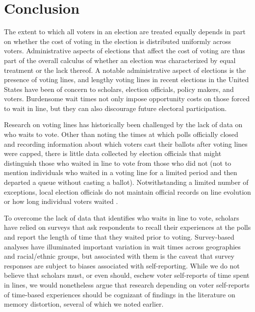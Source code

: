 \documentclass[12pt,titlepage]{article}
\begin{document}
\section*{Conclusion}

The extent to which all voters in an election are treated equally
depends in part on whether the cost of voting in the election is
distributed uniformly across voters. Administrative aspects of
elections that affect the cost of voting are thus part of the overall
calculus of whether an election was characterized by equal treatment
or the lack thereof.  A notable administrative aspect of elections is
the presence of voting lines, and lengthy voting lines in recent
elections in the United States have been of concern to scholars,
election officials, policy makers, and voters.  Burdensome wait times
not only impose opportunity costs on those forced to wait in line, but
they can also discourage future electoral participation.

Research on voting lines has historically been challenged by the lack
of data on who waits to vote.  Other than noting the times at which
polls officially closed and recording information about which voters
cast their ballots after voting lines were capped, there is little
data collected by election officials that might distinguish those who
waited in line to vote from those who did not (not to mention
individuals who waited in a voting line for a limited period and then
departed a queue without casting a ballot).  Notwithstanding a limited
number of exceptions, local election officials do not maintain
official records on line evolution or how long individual voters
waited \citep{herron:confidence}.


To overcome the lack of data that identifies who waits in line to
vote, scholars have relied on surveys that ask respondents to recall
their experiences at the polls and report the length of time that they
waited prior to voting.  Survey-based analyses have illuminated
important variation in wait times across geographies and racial/ethnic
groups, but associated with them is the caveat that survey responses
are subject to biases associated with self-reporting.  While we do not
believe that scholars must, or even should, eschew voter self-reports
of time spent in lines, we would nonetheless argue that research
depending on voter self-reports of time-based experiences should be
cognizant of findings in the literature on memory distortion, several
of which we noted earlier.
\end{document}
